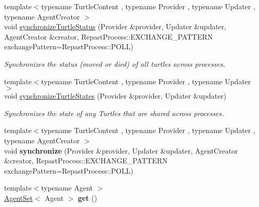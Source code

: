 \begin{DoxyCompactItemize}
{\footnotesize template$<$typename Turtle\-Content , typename Provider , typename Updater , typename Agent\-Creator $>$ }\\void \hyperlink{classrepast_1_1relogo_1_1_observer_a966b0c9fac6e6d4e3e21f74ac3b955b6}{synchronize\-Turtle\-Status} (Provider \&provider, Updater \&updater, Agent\-Creator \&creator, Repast\-Process\-::\-E\-X\-C\-H\-A\-N\-G\-E\-\_\-\-P\-A\-T\-T\-E\-R\-N exchange\-Pattern=Repast\-Process\-::\-P\-O\-L\-L)
\begin{DoxyCompactList}\small\item\em Synchronizes the status (moved or died) of all turtles across processes. \end{DoxyCompactList}\item 
{\footnotesize template$<$typename Turtle\-Content , typename Provider , typename Updater $>$ }\\void \hyperlink{classrepast_1_1relogo_1_1_observer_a4db8efa2a511050a5432c185816d3cec}{synchronize\-Turtle\-States} (Provider \&provider, Updater \&updater)
\begin{DoxyCompactList}\small\item\em Synchronizes the state of any Turtles that are shared across processes. \end{DoxyCompactList}\item 
\hypertarget{classrepast_1_1relogo_1_1_observer_a0268b843eec648ada141c031f6a13621}{{\footnotesize template$<$typename Turtle\-Content , typename Provider , typename Updater , typename Agent\-Creator $>$ }\\void {\bfseries synchronize} (Provider \&provider, Updater \&updater, Agent\-Creator \&creator, Repast\-Process\-::\-E\-X\-C\-H\-A\-N\-G\-E\-\_\-\-P\-A\-T\-T\-E\-R\-N exchange\-Pattern=Repast\-Process\-::\-P\-O\-L\-L)}\label{classrepast_1_1relogo_1_1_observer_a0268b843eec648ada141c031f6a13621}

\item 
\hypertarget{classrepast_1_1relogo_1_1_observer_aa7cb67c53a3a3b5012494bb45f0c6b40}{{\footnotesize template$<$typename Agent $>$ }\\\hyperlink{classrepast_1_1relogo_1_1_agent_set}{Agent\-Set}$<$ Agent $>$ {\bfseries get} ()}\label{classrepast_1_1relogo_1_1_observer_aa7cb67c53a3a3b5012494bb45f0c6b40}

\end{DoxyCompactItemize}
